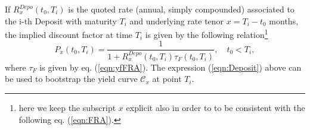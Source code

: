 \documentclass[11pt,reqno]{amsart}
\begin{document}
\par
If $R^{Depo}_x\left(t_0,T_i\right)$ is the quoted rate (annual, simply compounded) associated to the i-th Deposit with maturity $T_i$ and underlying rate tenor $x=T_i - t_0$ months, the implied discount factor at time $T_i$ is given by the following relation\footnote{here we keep the subscript $x$ explicit also in order to to be consistent with the following eq. (\ref{eqn:FRA}).}
\begin{equation}
P_x(t_0,T_i) = \frac{1}{1 + R^{Depo}_x\left(t_0,T_i\right)\tau_F\left(t_0,T_i\right)},\quad t_0<T_i,
\label{eqn:Deposit}
\end{equation}
where $\tau_F$ is given by eq. (\ref{eqn:yfFRA}). The expression (\ref{eqn:Deposit}) above can be used to bootstrap the yield curve $\mathcal{C}_x$ at point $T_i$.
\end{document}
